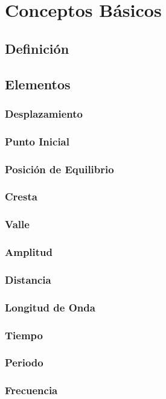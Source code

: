 \chapter{Conceptos Básicos}%
\section{Definición}%

\section{Elementos}

\subsection{Desplazamiento}

\subsection{Punto Inicial}

\subsection{Posición de Equilibrio}

\subsection{Cresta}

\subsection{Valle}

\subsection{Amplitud}

\subsection{Distancia}

\subsection{Longitud de Onda}

\subsection{Tiempo}

\subsection{Periodo}

\subsection{Frecuencia}

